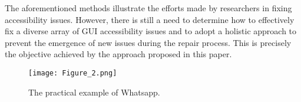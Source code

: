 The aforementioned methods illustrate the efforts made by researchers in fixing accessibility issues.
However, there is still a need to determine how to effectively fix a diverse array of GUI accessibility issues and to adopt a holistic approach to prevent the emergence of new issues during the repair process.
This is precisely the objective achieved by the approach proposed in this paper.


\begin{figure}
\centering
\texttt{[image: Figure\_2.png]}
\caption{The practical example of Whatsapp.}
\label{fig: whatsapp}
\end{figure}
